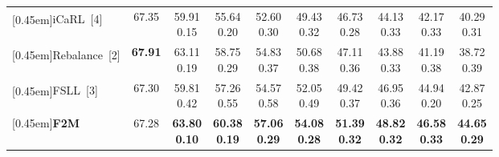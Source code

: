 \documentclass{article}
\begin{document}
\begin{table*}[ht]
{\begin{tabular}{lccccccccc}
  \rule{0pt}{5ex}\multirow{1}{*}[0.45em]{iCaRL~[4]\textsuperscript{} }     & \multirow{1}{*}[0.5em]{67.35} & \shortstack[r]{59.91 \\   0.15} & \shortstack[r]{55.64 \\   0.20} & \shortstack[r]{52.60 \\   0.30} & \shortstack[r]{49.43 \\   0.32} & \shortstack[r]{46.73\\   0.28} & \shortstack[r]{44.13 \\   0.33} & \shortstack[r]{42.17 \\   0.33} & \shortstack[r]{40.29 \\   0.31} \\
  \rule{0pt}{5ex}\multirow{1}{*}[0.45em]{Rebalance~[2]\textsuperscript{} }   & \multirow{1}{*}[0.5em]{\textbf{67.91}} & \shortstack[r]{63.11 \\   0.19} & \shortstack[r]{58.75 \\   0.29} & \shortstack[r]{54.83 \\   0.37} & \shortstack[r]{50.68 \\   0.38} & \shortstack[r]{47.11\\   0.36} & \shortstack[r]{43.88 \\   0.33} & \shortstack[r]{41.19 \\   0.38} & \shortstack[r]{38.72 \\   0.39} \\
  \rule{0pt}{5ex}\multirow{1}{*}[0.45em]{FSLL~[3]\textsuperscript{} }       & \multirow{1}{*}[0.5em]{67.30} & \shortstack[r]{59.81 \\   0.42} & \shortstack[r]{57.26 \\   0.55} & \shortstack[r]{54.57 \\   0.58} & \shortstack[r]{52.05 \\   0.49} & \shortstack[r]{49.42\\   0.37} & \shortstack[r]{46.95 \\   0.36} & \shortstack[r]{44.94 \\   0.20} & \shortstack[r]{42.87 \\   0.25} \\
  \rule{0pt}{5ex}\multirow{1}{*}[0.45em]{\textbf{F2M}}                                   & \multirow{1}{*}[0.5em]{67.28} & \shortstack[r]{\textbf{63.80} \\  \textbf{0.10}} & \shortstack[r]{\textbf{60.38} \\  \textbf{0.19}} & \shortstack[r]{\textbf{57.06} \\  \textbf{0.29}} & \shortstack[r]{\textbf{54.08} \\  \textbf{0.28}} & \shortstack[r]{\textbf{51.39} \\  \textbf{0.32}} & \shortstack[r]{\textbf{48.82} \\  \textbf{0.32}} & \shortstack[r]{\textbf{46.58} \\  \textbf{0.33}} & \shortstack[r]{\textbf{44.65} \\  \textbf{0.29}} \\

\end{tabular}}
\end{table*}
\end{document}
